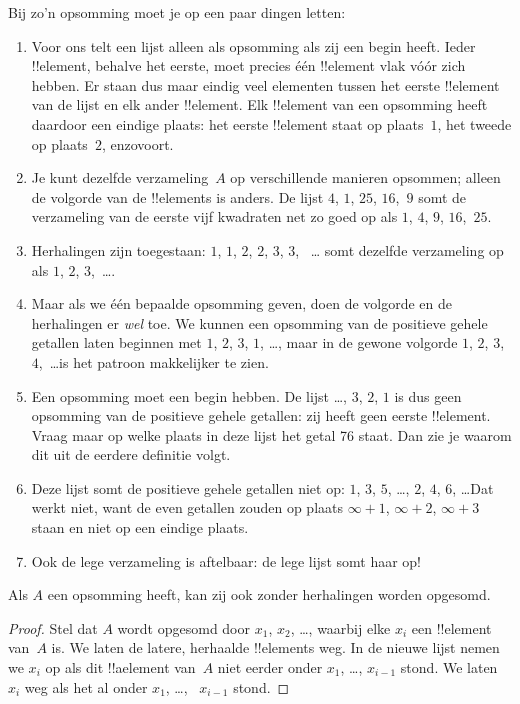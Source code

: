 \documentclass[openany]{memoir}
\begin{document}
\begin{explain}
Bij zo'n opsomming moet je op een paar dingen letten:
\begin{enumerate}
\item Voor ons telt een lijst alleen als opsomming als zij een begin
  heeft. Ieder !!{element}, behalve het eerste, moet precies één
  !!{element} vlak vóór zich hebben. Er staan dus maar eindig veel
  elementen tussen het eerste !!{element} van de lijst en elk ander
  !!{element}. Elk !!{element} van een opsomming heeft daardoor een
  eindige plaats: het eerste !!{element} staat op plaats~$1$, het
  tweede op plaats~$2$, enzovoort.
\item Je kunt dezelfde verzameling~$A$ op verschillende manieren
  opsommen; alleen de volgorde van de !!{element}s is anders. De lijst
  $4$, $1$, $25$, $16$,~$9$ somt de verzameling van
  de eerste vijf kwadraten net zo goed op als $1$, $4$, $9$, $16$,~$25$.
\item Herhalingen zijn toegestaan: $1$, $1$, $2$, $2$, $3$, $3$,
  ~\dots{} somt dezelfde verzameling op als $1$, $2$, $3$,~\dots{}.
\item Maar als we één bepaalde opsomming geven, doen de volgorde en de
  herhalingen er \emph{wel} toe. We kunnen een opsomming van de positieve
  gehele getallen laten beginnen met $1$, $2$, $3$, $1$, \dots{}, maar in de gewone
  volgorde $1$, $2$, $3$, $4$,~\dots is het patroon makkelijker te zien.
\item Een opsomming moet een begin hebben. De lijst \dots, $3$, $2$,
  $1$ is dus geen opsomming van de positieve gehele getallen: zij heeft
  geen eerste !!{element}. Vraag maar op welke plaats in deze lijst het
  getal 76 staat. Dan zie je waarom dit uit de eerdere definitie volgt.
\item Deze lijst somt de positieve gehele getallen niet op: $1$, $3$,
  $5$, \dots, $2$, $4$, $6$, \dots\@ Dat werkt niet, want de even
  getallen zouden op plaats $\infty + 1$, $\infty + 2$, $\infty + 3$
  staan en niet op een eindige plaats.
\item Ook de lege verzameling is aftelbaar: de lege lijst somt haar op!{}
\end{enumerate}
\end{explain}

\begin{prop}
  Als $A$ een opsomming heeft, kan zij ook zonder herhalingen worden
  opgesomd.
\end{prop}

\begin{proof}
  Stel dat $A$ wordt opgesomd door $x_1$, $x_2$, \dots{}, waarbij elke
  $x_i$ een !!{element} van~$A$ is. We laten de latere, herhaalde !!{element}s weg.
  In de nieuwe lijst nemen we $x_i$ op als dit !!a{element} van~$A$
  niet eerder onder $x_1$, \dots,
  $x_{i-1}$ stond. We laten $x_i$ weg als het al onder $x_1$, \dots,
  ~$x_{i-1}$ stond.
\end{proof}
\end{document}
